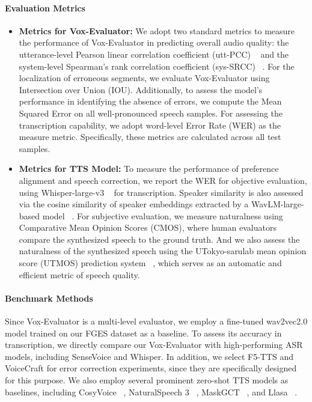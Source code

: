\documentclass[letterpaper]{article} %
\begin{document}
\paragraph{Evaluation Metrics} 
\begin{itemize}
    \item \textbf{Metrics for Vox-Evaluator:} We adopt two standard metrics to measure the performance of Vox-Evaluator in predicting overall audio quality: the utterance-level Pearson linear correlation coefficient (utt-PCC) ~\cite{benesty2009pearson} and the system-level Spearman’s rank correlation coefficient (sys-SRCC) ~\cite{sedgwick2014spearman}. For the localization of erroneous segments, we evaluate Vox-Evaluator using Intersection over Union (IOU). Additionally, to assess the model’s performance in identifying the absence of errors, we compute the Mean Squared Error on all well-pronounced speech samples. For assessing the transcription capability, we adopt word-level Error Rate (WER) as the measure metric. Specifically, these metrics are calculated across all test samples. 
    \item \textbf{Metrics for TTS Model:} To measure the performance of preference alignment and speech correction, we report the WER for objective evaluation, using Whisper-large-v3 ~\cite{radford2023robust} for transcription. Speaker similarity is also assessed via the cosine similarity of speaker embeddings extracted by a WavLM-large-based model ~\cite{chen2022wavlm}. For subjective evaluation, we measure naturalness using Comparative Mean Opinion Scores (CMOS), where human evaluators compare the synthesized speech to the ground truth. And we also assess the naturalness of the synthesized speech using the UTokyo-sarulab mean opinion score (UTMOS) prediction system ~\cite{saeki2022utmos}, which serves as an automatic and efficient metric of speech quality.
\end{itemize}

\paragraph{Benchmark Methods} 
Since Vox-Evaluator is a multi-level evaluator, we employ a fine-tuned wav2vec2.0 model trained on our FGES dataset as a baseline. To assess its accuracy in transcription, we directly compare our Vox-Evaluator with high-performing ASR models, including SenseVoice and Whisper. In addition, we select F5-TTS and VoiceCraft for error correction experiments, since they are specifically designed for this purpose. We also employ several prominent zero-shot TTS models as baselines, including CosyVoice ~\cite{du2024cosyvoice}, NaturalSpeech 3 ~\cite{ju2024naturalspeech}, MaskGCT ~\cite{wang2024maskgct}, and Llasa ~\cite{ye2025llasa}.
\end{document}
